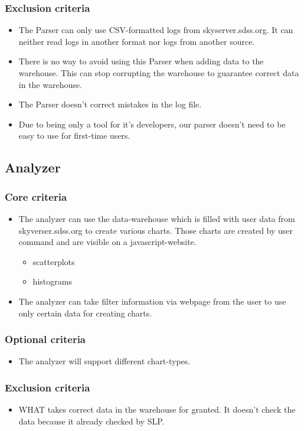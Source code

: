 \subsubsection{Exclusion criteria}
\begin{itemize}
\item The Parser can only use CSV-formatted logs from skyserver.sdss.org. 
It can neither read logs in another format nor logs
from another source.
\item There is no way to avoid using this Parser when adding data to the warehouse. 
This can stop corrupting the warehouse to guarantee correct data in the warehouse.
\item The Parser doesn't correct mistakes in the log file.
\item Due to being only a tool for it's developers, our parser doesn't need to be easy to use for first-time users.
\end{itemize}



\subsection{Analyzer}

\subsubsection{Core criteria}
\begin{itemize}
\item The analyzer can use the data-warehouse which is filled with user data  
from skyverser.sdss.org to create various charts. 
Those charts are created by user command and are visible on a javascript-website.
\begin{itemize}
\item scatterplots
\item histograms
\end{itemize}
\item The analyzer can take filter information via webpage from the user to use only certain data for creating charts.
\end{itemize}

\subsubsection{Optional criteria}
\begin{itemize}
\item The analyzer will support different chart-types.
\end{itemize}

\subsubsection{Exclusion criteria}
\begin{itemize}
\item WHAT takes correct data in the warehouse for granted. It doesn't check the
 data because it already checked by SLP. 
\end{itemize}




